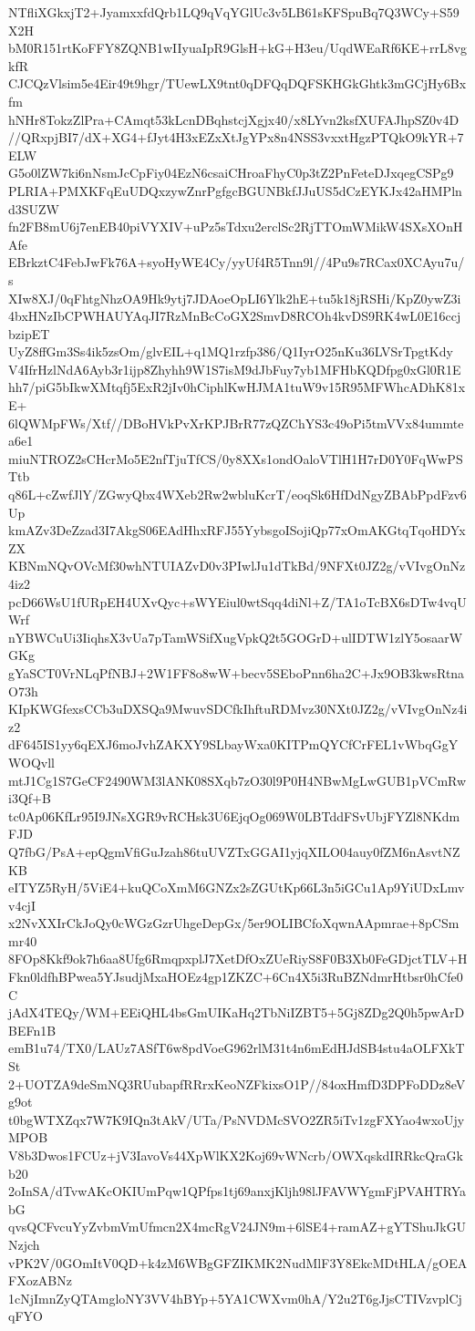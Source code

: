 NTfliXGkxjT2+JyamxxfdQrb1LQ9qVqYGlUc3v5LB61sKFSpuBq7Q3WCy+S59X2H
bM0R151rtKoFFY8ZQNB1wIIyuaIpR9GlsH+kG+H3eu/UqdWEaRf6KE+rrL8vgkfR
CJCQzVlsim5e4Eir49t9hgr/TUewLX9tnt0qDFQqDQFSKHGkGhtk3mGCjHy6Bxfm
hNHr8TokzZlPra+CAmqt53kLcnDBqhstcjXgjx40/x8LYvn2ksfXUFAJhpSZ0v4D
//QRxpjBI7/dX+XG4+fJyt4H3xEZxXtJgYPx8n4NSS3vxxtHgzPTQkO9kYR+7ELW
G5o0lZW7ki6nNsmJcCpFiy04EzN6csaiCHroaFhyC0p3tZ2PnFeteDJxqegCSPg9
PLRIA+PMXKFqEuUDQxzywZnrPgfgcBGUNBkfJJuUS5dCzEYKJx42aHMPlnd3SUZW
fn2FB8mU6j7enEB40piVYXIV+uPz5sTdxu2erclSc2RjTTOmWMikW4SXsXOnHAfe
EBrkztC4FebJwFk76A+syoHyWE4Cy/yyUf4R5Tnn9l//4Pu9s7RCax0XCAyu7u/s
XIw8XJ/0qFhtgNhzOA9Hk9ytj7JDAoeOpLI6Ylk2hE+tu5k18jRSHi/KpZ0ywZ3i
4bxHNzIbCPWHAUYAqJI7RzMnBcCoGX2SmvD8RCOh4kvDS9RK4wL0E16ccjbzipET
UyZ8ffGm3Ss4ik5zsOm/glvEIL+q1MQ1rzfp386/Q1IyrO25nKu36LVSrTpgtKdy
V4IfrHzlNdA6Ayb3r1ijp8Zhyhh9W1S7isM9dJbFuy7yb1MFHbKQDfpg0xGl0R1E
hh7/piG5bIkwXMtqfj5ExR2jIv0hCiphlKwHJMA1tuW9v15R95MFWhcADhK81xE+
6lQWMpFWs/Xtf//DBoHVkPvXrKPJBrR77zQZChYS3c49oPi5tmVVx84ummtea6e1
miuNTROZ2sCHcrMo5E2nfTjuTfCS/0y8XXs1ondOaloVTlH1H7rD0Y0FqWwPSTtb
q86L+cZwfJlY/ZGwyQbx4WXeb2Rw2wbluKcrT/eoqSk6HfDdNgyZBAbPpdFzv6Up
kmAZv3DeZzad3I7AkgS06EAdHhxRFJ55YybsgoISojiQp77xOmAKGtqTqoHDYxZX
KBNmNQvOVcMf30whNTUIAZvD0v3PIwlJu1dTkBd/9NFXt0JZ2g/vVIvgOnNz4iz2
pcD66WsU1fURpEH4UXvQyc+sWYEiul0wtSqq4diNl+Z/TA1oTcBX6sDTw4vqUWrf
nYBWCuUi3IiqhsX3vUa7pTamWSifXugVpkQ2t5GOGrD+ulIDTW1zlY5osaarWGKg
gYaSCT0VrNLqPfNBJ+2W1FF8o8wW+becv5SEboPnn6ha2C+Jx9OB3kwsRtnaO73h
KIpKWGfexsCCb3uDXSQa9MwuvSDCfkIhftuRDMvz30NXt0JZ2g/vVIvgOnNz4iz2
dF645IS1yy6qEXJ6moJvhZAKXY9SLbayWxa0KITPmQYCfCrFEL1vWbqGgYWOQvll
mtJ1Cg1S7GeCF2490WM3lANK08SXqb7zO30l9P0H4NBwMgLwGUB1pVCmRwi3Qf+B
tc0Ap06KfLr95I9JNsXGR9vRCHsk3U6EjqOg069W0LBTddFSvUbjFYZl8NKdmFJD
Q7fbG/PsA+epQgmVfiGuJzah86tuUVZTxGGAI1yjqXILO04auy0fZM6nAsvtNZKB
eITYZ5RyH/5ViE4+kuQCoXmM6GNZx2sZGUtKp66L3n5iGCu1Ap9YiUDxLmvv4cjI
x2NvXXIrCkJoQy0cWGzGzrUhgeDepGx/5er9OLIBCfoXqwnAApmrae+8pCSmmr40
8FOp8Kkf9ok7h6aa8Ufg6RmqpxplJ7XetDfOxZUeRiyS8F0B3Xb0FeGDjctTLV+H
Fkn0ldfhBPwea5YJsudjMxaHOEz4gp1ZKZC+6Cn4X5i3RuBZNdmrHtbsr0hCfe0C
jAdX4TEQy/WM+EEiQHL4bsGmUIKaHq2TbNiIZBT5+5Gj8ZDg2Q0h5pwArDBEFn1B
emB1u74/TX0/LAUz7ASfT6w8pdVoeG962rlM31t4n6mEdHJdSB4stu4aOLFXkTSt
2+UOTZA9deSmNQ3RUubapfRRrxKeoNZFkixsO1P//84oxHmfD3DPFoDDz8eVg9ot
t0bgWTXZqx7W7K9IQn3tAkV/UTa/PsNVDMcSVO2ZR5iTv1zgFXYao4wxoUjyMPOB
V8b3Dwos1FCUz+jV3IavoVs44XpWlKX2Koj69vWNcrb/OWXqskdIRRkcQraGkb20
2oInSA/dTvwAKcOKIUmPqw1QPfps1tj69anxjKljh98lJFAVWYgmFjPVAHTRYabG
qvsQCFvcuYyZvbmVmUfmcn2X4mcRgV24JN9m+6lSE4+ramAZ+gYTShuJkGUNzjch
vPK2V/0GOmItV0QD+k4zM6WBgGFZIKMK2NudMlF3Y8EkcMDtHLA/gOEAFXozABNz
1cNjImnZyQTAmgloNY3VV4hBYp+5YA1CWXvm0hA/Y2u2T6gJjsCTIVzvplCjqFYO
